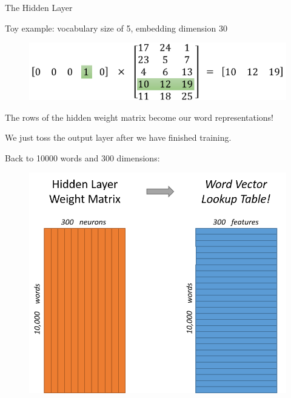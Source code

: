 \documentclass{beamer}
\begin{document}
	\begin{frame}[allowframebreaks]{The Hidden Layer}
		
		Toy example: vocabulary size of 5, embedding dimension 30
		
		\begin{figure}
			\centering
			\includegraphics[width=\textwidth]{presentation_5_figures/matrix_mult_w_one_hot}
		\end{figure}
		
		The rows of the hidden weight matrix become our word representations!
		
		We just toss the output layer after we have finished training.
		
		\pagebreak
		
		Back to 10000 words and 300 dimensions:

		\begin{figure}
			\centering
			\includegraphics[scale=0.5]{presentation_5_figures/word2vec_weight_matrix_lookup_table}
		\end{figure}

		
	\end{frame}
	
\end{document}
